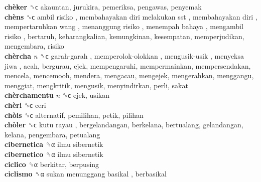 \textbf{chèker} ␝ϲ  akauntan, jurukira, pemeriksa, pengawas, penyemak  \\
\textbf{chèns} ␝ϲ   ambil risiko ,  membahayakan diri melakukan sst ,  membahayakan diri ,  mempertaruhkan wang ,  menanggung risiko ,  menempah bahaya ,  mengambil risiko , bertaruh, kebarangkalian, kemungkinan, kesempatan, memperjudikan, mengembara, risiko  \\
\textbf{chèrcha} \emph{n}  ␝ϲ   garah-garah ,  memperolok-olokkan ,  mengusik-usik ,  menyeksa jiwa , acah, bergurau, ejek, mempengaruhi, mempermainkan, mempersendakan, mencela, mencemooh, mendera, mengacau, mengejek, mengerahkan, menggangu, menggiat, mengkritik, mengusik, menyindirkan, perli, sakat  \\
\textbf{chèrchamentu} \emph{n}  ␝ϲ  ejek, usikan  \\
\textbf{chèri} ␝ϲ  ceri  \\
\textbf{chòis} ␝ϲ  alternatif, pemilihan, petik, pilihan  \\
\textbf{chòler} ␝ϲ   kutu rayau , bergelandangan, berkelana, bertualang, gelandangan, kelana, pengembara, petualang  \\
\textbf{cibernetica} ␝α   ilmu sibernetik   \\
\textbf{cibernetico} ␝α   ilmu sibernetik   \\
\textbf{ciclico} ␝α  berkitar, berpusing  \\
\textbf{ciclismo} ␝α   sukan menunggang basikal , berbasikal  \\
